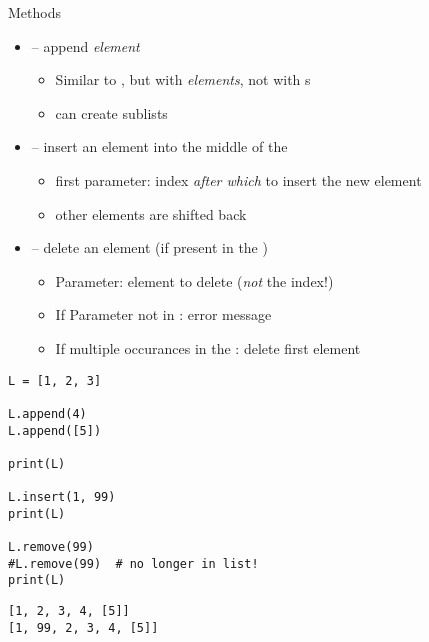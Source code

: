 
\begin{frame}[fragile]
%
\begin{minipage}{.49\linewidth}
\begin{Large}
Methods
\vspace{0pt}
\end{Large}
\begin{itemize}
\item {} -- append \emph{element}
	\begin{itemize}
	\item Similar to \inPy{+=}, but with \emph{elements}, not with s
	\item can create sublists
	\end{itemize}
\item {} -- insert an element into the middle of the 
	\begin{itemize}
	\item first parameter: index \emph{after which} to insert the new element
	\item other elements are shifted back
	\end{itemize}
\item {} -- delete an element (if present in the )
	\begin{itemize}
	\item Parameter: element to delete (\emph{not} the index!)
	\item If Parameter not in : error message
	\item If multiple occurances in the : delete first element
	\end{itemize}
\end{itemize}
\end{minipage}
%
\begin{minipage}{.49\linewidth}
\phantom{x}
\begin{codebox}
\begin{verbatim}
L = [1, 2, 3]

L.append(4)
L.append([5])

print(L)

L.insert(1, 99)
print(L)

L.remove(99)
#L.remove(99)  # no longer in list!
print(L)
\end{verbatim}
\end{codebox}
%
\begin{cmdbox}
\begin{verbatim}
[1, 2, 3, 4, [5]]
[1, 99, 2, 3, 4, [5]]
\end{verbatim}
\end{cmdbox}
\end{minipage}
%
\end{frame}

